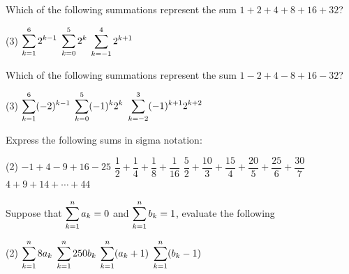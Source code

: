 \documentclass[answers]{exam}
\begin{document}
  \begin{ex*}
    Which of the following summations represent the sum $1+2+4+8+16+32$?
    \begin{tasks}(3)
      \task $\ds\sum\kto^6 2^{k-1}$
      \task $\ds\sum\kto[0]^5 2^k$
      \task $\ds\sum\kto[-1]^4 2^{k+1}$
    \end{tasks}
  \end{ex*}
  
  \begin{ex*}
    Which of the following summations represent the sum $1-2+4-8+16-32$?
    \begin{tasks}(3)
      \task $\ds\sum\kto^6 (-2)^{k-1}$
      \task $\ds\sum\kto[0]^5 (-1)^k2^k$
      \task $\ds\sum\kto[-2]^3 (-1)^{k+1}2^{k+2}$
    \end{tasks}
  \end{ex*}
  \pagebreak
  
  \begin{ex*}
    Express the following sums in sigma notation:
  \end{ex*}
  \begin{tasks}[after-item-skip=\stretch{1}](2)
    \task $-1+4-9+16-25$
    \task $\dfrac{1}{2}+\dfrac{1}{4}+\dfrac{1}{8}+\dfrac{1}{16}$
    \task $\dfrac{5}{2}+\dfrac{10}{3}+\dfrac{15}{4}+\dfrac{20}{5}+\dfrac{25}{6}+\dfrac{30}{7}$
    \task $4+9+14+\cdots+44$
  \end{tasks}
  
  \begin{ex*}
    Suppose that $\Sum\kto^n a_k=0$ and $\Sum\kto^n b_k=1$, evaluate the following
  \end{ex*}
  \begin{tasks}[after-item-skip=\stretch{1}](2)
    \task $\ds\sum\kto^n 8a_k$
    \task $\ds\sum\kto^n 250b_k$
    \task $\ds\sum\kto^n (a_k+1)$
    \task $\ds\sum\kto^n (b_k-1)$
  \end{tasks}
  \pagebreak
  
  \noindent
  
\end{document}
